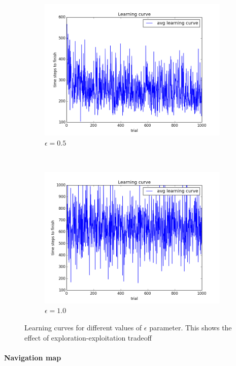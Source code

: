 \begin{figure}[h!]
\begin{subfigure}[b]{0.4\textwidth}
    \includegraphics[width=\textwidth]{figures/epsilon_5_learning_curve.png}
    \caption{\label{fig:eps5}$\epsilon = 0.5$}
\end{subfigure}
~
\begin{subfigure}[b]{0.4\textwidth}
    \includegraphics[width=\textwidth]{figures/epsilon_10_learning_curve.png}
    \caption{\label{fig:eps10}$\epsilon = 1.0$}
\end{subfigure}
\caption{\label{fig:eps}Learning curves for different values of $\epsilon$
parameter. This shows the effect of exploration-exploitation tradeoff}
\end{figure}
 


\paragraph{Navigation map}

